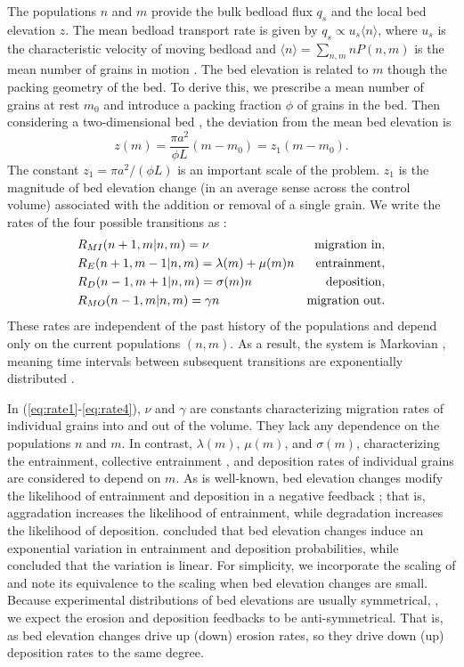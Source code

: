 \documentclass[draft]{agujournal2018}
\newcommand\be{\begin{equation}} %
\newcommand\ee{\end{equation}}   %
\newcommand\bra{\langle}
\newcommand\ket{\rangle}
\begin{document}
The populations $n$ and $m$ provide the bulk bedload flux $q_s$ and the local bed elevation $z$.
The mean bedload transport rate is given by $q_s \propto u_s \bra n \ket$, where $u_s$ is the characteristic velocity of moving bedload and $\bra n \ket = 
\sum_{n,m}nP(n,m) $ is the mean number of grains in motion \citep[e.g.][]{Charru2004, Ancey2008, Furbish2012a}.
The bed elevation is related to $m$ though the packing geometry of the bed.
To derive this, we prescribe a mean number of grains at rest $m_0$ and introduce a packing fraction $\phi$ of grains in the bed.
Then considering a two-dimensional bed \citep[e.g.][]{Einstein1950, Paintal1971}, the deviation from the mean bed elevation is
\be z(m) = \frac{\pi a^2}{\phi L}(m-m_0) = z_1(m-m_0). \label{eq:ele}\ee
The constant $z_1 = \pi a^2/(\phi L)$ is an important scale of the problem. 
$z_1$ is the magnitude of bed elevation change (in an average sense across the control volume) associated with the addition or removal of a single grain.
We write the rates of the four possible transitions as \citep[e.g.][]{Ancey2008}:
\begin{align}
 &R_{MI}(n+1,m|n,m) = \nu & \text{migration in}, \label{eq:rate1}\\
 &R_E(n+1,m-1|n,m) =\lambda(m) + \mu(m) n  & \text{entrainment},  \label{eq:rate2}\\
 &R_D(n-1,m+1|n,m) =\sigma(m) n & \text{deposition},\label{eq:rate3}\\
 &R_{MO}(n-1,m|n,m) =\gamma n & \text{migration out\label{eq:rate4}}.
\end{align}
These rates are independent of the past history of the populations and depend only on the current populations $(n,m)$. 
As a result, the system is Markovian \citep[e.g.][]{Cox1965, VanKampen1992}, meaning time intervals between subsequent transitions are exponentially distributed \citep[e.g.][]{Gillespie2007}.

In (\ref{eq:rate1}-\ref{eq:rate4}), $\nu$ and $\gamma$ are constants characterizing migration rates of individual grains into and out of the volume. 
They lack any dependence on the populations $n$ and $m$.
In contrast, $\lambda(m)$, $\mu(m)$, and $\sigma(m)$, characterizing the entrainment, collective entrainment \citep[e.g.][]{Ancey2008, Heyman2013, Heyman2014}, and deposition rates of individual grains are considered to depend on $m$.
As is well-known, bed elevation changes modify the likelihood of entrainment and deposition in a negative feedback \citep{Sawai1987, Wong2007}; that is, aggradation increases the likelihood of entrainment, while degradation increases the likelihood of deposition.
\citet{Wong2007} concluded that bed elevation changes induce an exponential variation in entrainment and deposition probabilities, while \citet{Sawai1987} concluded that the variation is linear.
For simplicity, we incorporate the scaling of \citet{Sawai1987} and note its equivalence to the \citet{Wong2007} scaling when bed elevation changes are small.
Because experimental distributions of bed elevations are usually symmetrical, \citep{Wong2007, Singh2009, Martin2014}, we expect the erosion and deposition feedbacks to be anti-symmetrical.
That is, as bed elevation changes drive up (down) erosion rates, so they drive down (up) deposition rates to the same degree.
\end{document}
